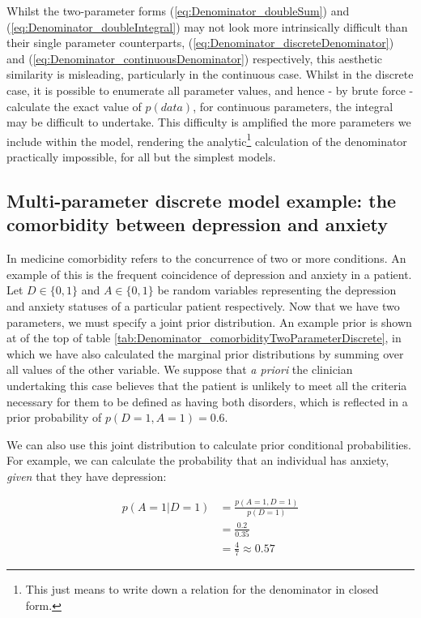 \documentclass[11pt,fullpage]{book}
\begin{document}
Whilst the two-parameter forms (\ref{eq:Denominator_doubleSum}) and (\ref{eq:Denominator_doubleIntegral}) may not look more intrinsically difficult than their single parameter counterparts, (\ref{eq:Denominator_discreteDenominator}) and (\ref{eq:Denominator_continuousDenominator}) respectively, this aesthetic similarity is misleading, particularly in the continuous case. Whilst in the discrete case, it is possible to enumerate all parameter values, and hence - by brute force - calculate the exact value of $p(data)$, for continuous parameters, the integral may be difficult to undertake. This difficulty is amplified the more parameters we include within the model, rendering the analytic\footnote{This just means to write down a relation for the denominator in closed form.} calculation of the denominator practically impossible, for all but the simplest models.

\subsection{Multi-parameter discrete model example: the comorbidity between depression and anxiety}\label{sec:Denominator_comorbidityTwoParameterDiscrete}
In medicine comorbidity refers to the concurrence of two or more conditions. An example of this is the frequent coincidence of depression and anxiety in a patient. Let $D\in\{0,1\}$ and $A\in\{0,1\}$ be random variables representing the depression and anxiety statuses of a particular patient respectively. Now that we have two parameters, we must specify a joint prior distribution. An example prior is shown at of the top of table \ref{tab:Denominator_comorbidityTwoParameterDiscrete}, in which we have also calculated the marginal prior distributions by summing over all values of the other variable. We suppose that \textit{a priori} the clinician undertaking this case believes that the patient is unlikely to meet all the criteria necessary for them to be defined as having both disorders, which is reflected in a prior probability of $p(D=1,A=1)=0.6$.

We can also use this joint distribution to calculate prior conditional probabilities. For example, we can calculate the probability that an individual has anxiety, \textit{given} that they have depression:

\begin{equation}
\begin{align}
p(A=1|D=1) &= \frac{p(A=1,D=1)}{p(D=1)}\\
&= \frac{0.2}{0.35}\\
&=\frac{4}{7}\approx 0.57
\end{align}
\end{equation}
\end{document}
